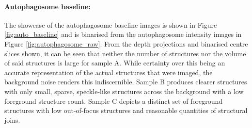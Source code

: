 \paragraph{Autophagosome baseline:} 
The showcase of the autophagosome baseline images is shown in Figure \ref{fig:auto_baseline} and is binarised from the autophagosome intensity images in Figure \ref{fig:autophagosome_raw}. From the depth projections and binarised centre slices shown, it can be seen that neither the number of structures nor the volume of said structures is large for sample A. While certainty over this being an accurate representation of the actual structures that were imaged, the background noise renders this indiscernible. Sample B produces clearer structures with only small, sparse, speckle-like structures across the background with a low foreground structure count. Sample C depicts a distinct set of foreground structures with low out-of-focus structures and reasonable quantities of structural joins. 
